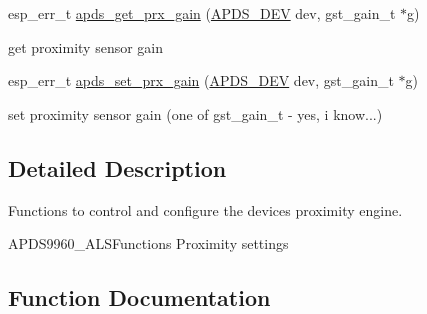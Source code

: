 \begin{DoxyCompactItemize}
\begin{DoxyCompactList}
\begin{DoxyItemize}
\end{DoxyItemize}\end{DoxyCompactList}\item 
esp\+\_\+err\+\_\+t \hyperlink{group__APDS9960__ProximityFunctions_gaa2c27abffecdaf1f8faa0943c87c136c}{apds\+\_\+get\+\_\+prx\+\_\+gain} (\hyperlink{structAPDS9960__Driver}{A\+P\+D\+S\+\_\+\+D\+EV} dev, gst\+\_\+gain\+\_\+t $\ast$g)
\begin{DoxyCompactList}\small\item\em 
\begin{DoxyItemize}
\item get proximity sensor gain 
\end{DoxyItemize}\end{DoxyCompactList}\item 
esp\+\_\+err\+\_\+t \hyperlink{group__APDS9960__ProximityFunctions_ga222563d48d4e342479a8f7cf373f655d}{apds\+\_\+set\+\_\+prx\+\_\+gain} (\hyperlink{structAPDS9960__Driver}{A\+P\+D\+S\+\_\+\+D\+EV} dev, gst\+\_\+gain\+\_\+t $\ast$g)
\begin{DoxyCompactList}\small\item\em 
\begin{DoxyItemize}
\item set proximity sensor gain (one of gst\+\_\+gain\+\_\+t -\/ yes, i know...) 
\end{DoxyItemize}\end{DoxyCompactList}\end{DoxyCompactItemize}


\subsection{Detailed Description}
Functions to control and configure the device\textquotesingle{}s proximity engine. 

A\+P\+D\+S9960\+\_\+\+A\+L\+S\+Functions Proximity settings 

\subsection{Function Documentation}
\mbox{\label{group__APDS9960__ProximityFunctions_gaa2c27abffecdaf1f8faa0943c87c136c}} 
